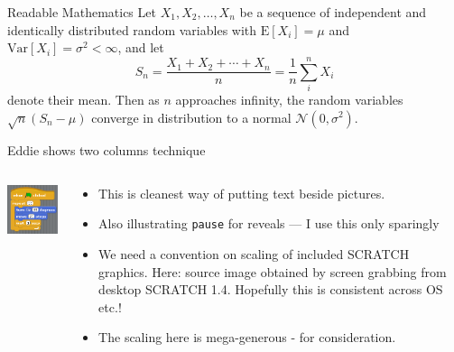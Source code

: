 \documentclass{beamer}
\begin{document}
\begin{frame}{Readable Mathematics}
Let $X_1, X_2, \ldots, X_n$ be a sequence of independent and identically distributed random variables with $\text{E}[X_i] = \mu$ and $\text{Var}[X_i] = \sigma^2 < \infty$, and let
$$S_n = \frac{X_1 + X_2 + \cdots + X_n}{n}
      = \frac{1}{n}\sum_{i}^{n} X_i$$
denote their mean. Then as $n$ approaches infinity, the random variables $\sqrt{n}(S_n - \mu)$ converge in distribution to a normal $\mathcal{N}(0, \sigma^2)$.
\end{frame}

\begin{frame}{Eddie shows two columns technique}
\begin{columns}
\begin{column}{0.4\textwidth}
\begin{center}
\includegraphics[scale=0.75]{SCRATCHgrab.png}
\end{center}
\end{column}
\begin{column}{0.6\textwidth}
\begin{itemize}
\item This is cleanest way of putting text beside
pictures. 
\item Also illustrating {\tt pause} for reveals --- I 
use this only sparingly
\pause\medskip
\item We need a convention on scaling of included SCRATCH graphics. Here: source image obtained by screen grabbing from desktop SCRATCH 1.4. Hopefully this is consistent across OS etc.! 
\medskip
\item The scaling here is mega-generous - for consideration.
\end{itemize}
\end{column}
\end{columns}
\end{frame}
\end{document}
